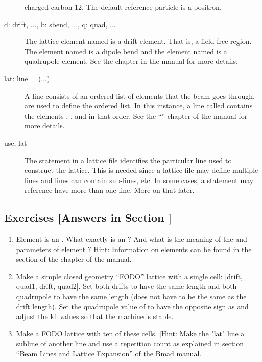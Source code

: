\documentclass{hitec}     %
\begin{document}
\begin{description}
charged carbon-12. The default reference particle is a positron.
  \item[d: drift, ..., b: sbend, ..., q: quad, ...] \Newline
The lattice element named  is a drift element. That is, a field free region. The element named
 is a dipole bend and the element named  is a quadrupole element. See the 
chapter in the \bmad manual for more details.
  \item[lat: line = (...)] \Newline
A line consists of an ordered list of elements that the beam goes through.  are used
to define the ordered list. In this instance, a line called  contains the elements
, , and  in that order. 
See the ``'' chapter of the \bmad manual for more details.
  \item[use, lat] \Newline
The  statement in a lattice file identifies the particular line used to construct the
lattice. This is needed since a lattice file may define multiple lines and lines can contain
sub-lines, etc. In some cases, a  statement may reference have more than one line. More
on that later.
  \end{description}

\subsection{Exercises [Answers in Section ]}
\label{s:bmad.intro.ex}

\begin{enumerate}[label=\thesection.\arabic{enumi}]
%
\item 
Element  is an . What exactly is an ? And what is the meaning of the
 and  parameters of element ? Hint: Information on  elements can be
found in the  section  of the  chapter of
the \bmad manual.
%
\item 
Make a simple closed geometry ``FODO'' lattice with a single cell: [drift, quad1, drift, quad2]. Set
both drifts to have the same length and both quadrupole to have the same length (does not have to be
the same as the drift length). Set the quadrupole  value of  to have the opposite
sign as  and adjust the k1 values so that the machine is stable.
%
\item 
Make a FODO lattice with ten of these cells.  [Hint: Make the "lat" line a subline of another line
and use a repetition count as explained in section  ``Beam Lines and
Lattice Expansion'' of the Bmad manual.
\end{enumerate}
\end{document}
